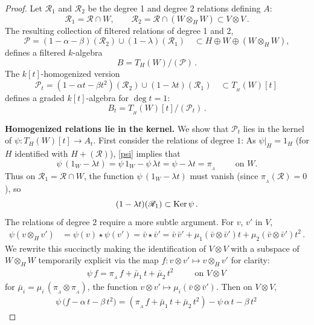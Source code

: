 \documentclass[11pt]{amsart}
\numberwithin{equation}{section}
\newcommand{\BBB}{B}
\newcommand{\sA}{A }
\newcommand{\RR}{\mathscr{R} }
\newcommand{\PP}{\mathscr{P}}
\renewcommand{\_}[1]{\mbox{$_{\left( #1 \right)}$}}
\renewcommand{\ker}{\mbox{\rm Ker\,}}
\newcommand{\ot}{\otimes}
\begin{document}
{\begin{proof}
Let $\RR_1$ and $\RR_2$ be the degree 1 and degree 2 relations defining $\sA$:
$$\RR_1=\RR\cap W ,
\qquad \RR_2=\RR\cap (W\ot_H W)\subset V\ot V\, .$$
  The resulting collection of filtered relations of degree 1 and 2,
  $$
  \PP=
  (1 -\alpha -\beta)(\RR_2)
  \cup (1-\lambda)(\RR_1)
\quad  \subset H\oplus W \oplus (W\ot_H W) , $$
defines a filtered $k$-algebra $$\BBB =  T_{H}(W)/(\PP)\, .$$
The $k[t]$-homogenized version
  $$    \PP_t=
  (1 -\alpha t -\beta t^2)(\RR_2)
  \cup (1-\lambda t)(\RR_1)
  \quad\subset T_{\! _H}(W)[t]
\, 
  $$
  defines a graded $k[t]$-algebra   for $\deg t=1$:
  $$\BBB_t =  T_{\! _H}(W)[t]/(\PP_t)\, .$$

  {\bf Homogenized relations lie in the kernel.}
  We show that $\PP_t$ lies in the kernel of $\psi:
  T_H(W)[t]\rightarrow \sA_t$.
  First consider the relations of degree $1$:
As $\psi\big|_H=1_H$ (for $H$ identified with $H+(\RR)$),
\cref{psi} implies that
$$
\psi\, (1_W-\lambda t)
=\psi\, 1_W -\psi\, \lambda t
=\psi-\lambda t
= \pi_{_\sA}
\qquad\text{ on $W$.}
$$
Thus on $\RR_1=\RR\cap W$,
the function
$\psi\, (1_W-\lambda t)$ must vanish
(since $\pi_{_\sA}(\RR)=0$), so 
\begin{equation}\label{R1}
(1-\lambda t)(\RR_1)\subset \ker \psi
\, .
\end{equation}
%
The relations of degree $2$ require a more subtle argument.
For $v$, $v'$ in $V$,
   $$
   \begin{aligned}
   \psi(v\ot_{H} v')
   &=\psi(v)\star \psi( v')  = \bar v \star \bar v'
   =
 \bar v \, \bar v' 
   + \mu_1(\bar v \ot \bar v' ) t 
   + \mu_2(\bar v \ot \bar v' )t^2\, 
   .
 \end{aligned}
 $$
 We rewrite this succinctly making the identification
 of $V\ot V$ with a subspace of $W\ot_H W$
 temporarily explicit via the map $f: v\ot v'\mapsto v\ot_H v'$
 for clarity:
    \begin{equation}\label{Onf}
   \begin{aligned}
   \psi \, f
   =\pi_{_\sA}\, f
      + \bar\mu_1 \, t 
   + \bar\mu_2\, t^2\, 
   \qquad\text{ on } V\ot V
\, 
 \end{aligned}
 \end{equation}
 for $\bar\mu_i=\mu_i\, (\pi_{_\sA}\ot \pi_{_\sA})$,
 the function $v\ot v'\mapsto 
 \mu_i(\bar v\ot \bar v')$.
Then on $V\ot V$,
$$
\begin{aligned}
  \psi \, \big(
  f
  - \alpha\,  t
  - \beta\,  t^2
  \big)
= (  \pi_{_\sA}\, f+\bar\mu_1\, t +\bar\mu_2\, t^2)
  -\psi\, \alpha\, t
  -\beta\, t^2
    \, 
\end{aligned}
$$
\end{proof}}
\end{document}
